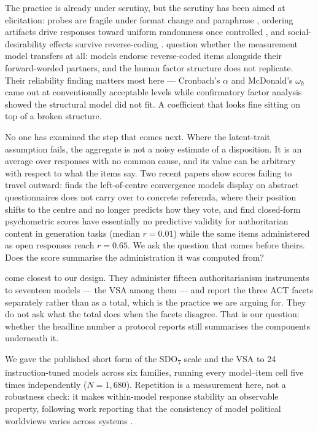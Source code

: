 \documentclass{article}
\begin{document}
The practice is already under scrutiny, but the scrutiny has been aimed
at elicitation: probes are fragile under format change and paraphrase
\citep{rottger2024}, ordering artifacts drive responses toward uniform
randomness once controlled \citep{dominguezolmedo2024}, and
social-desirability effects survive reverse-coding \citep{salecha2024}.
\citet{suhr2025} question whether the measurement model transfers at
all: models endorse reverse-coded items alongside their forward-worded
partners, and the human factor structure does not replicate. Their
reliability finding matters most here --- Cronbach's \(\alpha\) and
McDonald's \(\omega_h\) came out at conventionally acceptable levels
while confirmatory factor analysis showed the structural model did not
fit. A coefficient that looks fine sitting on top of a broken structure.

No one has examined the step that comes next. Where the latent-trait
assumption fails, the aggregate is not a noisy estimate of a
disposition. It is an average over responses with no common cause, and
its value can be arbitrary with respect to what the items say. Two
recent papers show scores failing to travel outward:
\citet{barmettler2026} finds the left-of-centre convergence models
display on abstract questionnaires does not carry over to concrete
referenda, where their position shifts to the centre and no longer
predicts how they vote, and \citet{einwiller2026} find closed-form
psychometric scores have essentially no predictive validity for
authoritarian content in generation tasks (median \(r = 0.01\)) while
the same items administered as open responses reach \(r = 0.65\). We ask
the question that comes before theirs. Does the score summarise the
administration it was computed from?

\citet{einwiller2026} come closest to our design. They administer
fifteen authoritarianism instruments to seventeen models --- the VSA
among them --- and report the three ACT facets separately rather than as
a total, which is the practice we are arguing for. They do not ask what
the total does when the facets disagree. That is our question: whether
the headline number a protocol reports still summarises the components
underneath it.

We gave the published short form of the SDO\textsubscript{7} scale
\citep{ho2015} and the VSA \citep{bizumic2018} to 24 instruction-tuned
models across six families, running every model--item cell five times
independently (\(N = 1{,}680\)). Repetition is a measurement here, not a
robustness check: it makes within-model response stability an observable
property, following work reporting that the consistency of model
political worldviews varies across systems \citep{ceron2024, moore2024}.
\end{document}
